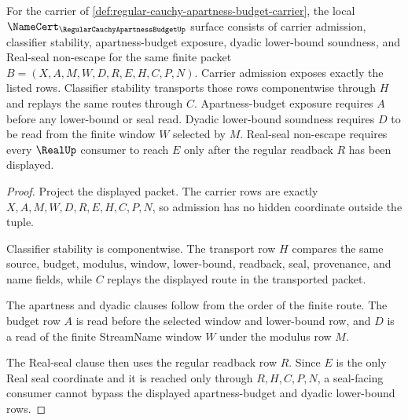 \begin{theorem}
\label{thm:regular-cauchy-apartness-budget-namecert-obligations}
For the carrier of \autoref{def:regular-cauchy-apartness-budget-carrier}, the local $\NameCert_{\RegularCauchyApartnessBudgetUp}$ surface consists of carrier admission, classifier stability, apartness-budget exposure, dyadic lower-bound soundness, and Real-seal non-escape for the same finite packet $B=(X,A,M,W,D,R,E,H,C,P,N)$. Carrier admission exposes exactly the listed rows. Classifier stability transports those rows componentwise through $H$ and replays the same routes through $C$. Apartness-budget exposure requires $A$ before any lower-bound or seal read. Dyadic lower-bound soundness requires $D$ to be read from the finite window $W$ selected by $M$. Real-seal non-escape requires every $\RealUp$ consumer to reach $E$ only after the regular readback $R$ has been displayed.
\end{theorem}
\begin{proof}
Project the displayed packet. The carrier rows are exactly $X,A,M,W,D,R,E,H,C,P,N$, so admission has no hidden coordinate outside the tuple.

Classifier stability is componentwise. The transport row $H$ compares the same source, budget, modulus, window, lower-bound, readback, seal, provenance, and name fields, while $C$ replays the displayed route in the transported packet.

The apartness and dyadic clauses follow from the order of the finite route. The budget row $A$ is read before the selected window and lower-bound row, and $D$ is a read of the finite StreamName window $W$ under the modulus row $M$.

The Real-seal clause then uses the regular readback row $R$. Since $E$ is the only Real seal coordinate and it is reached only through $R,H,C,P,N$, a seal-facing consumer cannot bypass the displayed apartness-budget and dyadic lower-bound rows.
\end{proof}


